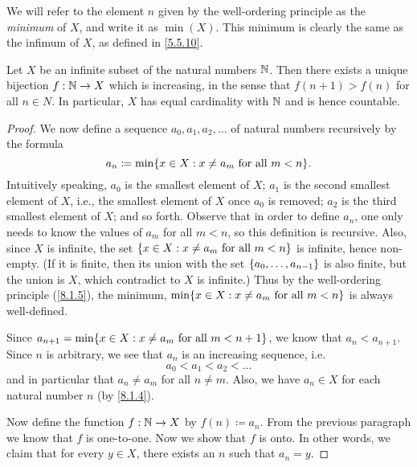\begin{note}
	We will refer to the element \(n\) given by the well-ordering principle as the \emph{minimum} of \(X\), and write it as \(\min(X)\).
	This minimum is clearly the same as the infimum of \(X\), as defined in \cref{5.5.10}.
\end{note}

\begin{prop}\label{8.1.5}
	Let \(X\) be an infinite subset of the natural numbers \(\mathbb{N}\).
	Then there exists a unique bijection \(f : \mathbb{N} \to X\) which is increasing, in the sense that \(f(n + 1) > f(n)\) for all \(n \in N\).
	In particular, \(X\) has equal cardinality with \(\mathbb{N}\) and is hence countable.
\end{prop}

\begin{proof}
	We now define a sequence \(a_0, a_1, a_2, \dots\) of natural numbers recursively by the formula
	\[
		a_n \coloneqq \min\set{x \in X : x \neq a_m \text{ for all } m < n}.
	\]
	Intuitively speaking, \(a_0\) is the smallest element of \(X\);
	\(a_1\) is the second smallest element of \(X\), i.e., the smallest element of \(X\) once \(a_0\) is removed;
	\(a_2\) is the third smallest element of \(X\);
	and so forth.
	Observe that in order to define \(a_n\), one only needs to know the values of \(a_m\) for all \(m < n\), so this definition is recursive.
	Also, since \(X\) is infinite, the set \(\left\lbrace x \in X : x \neq a_m \text{ for all } m < n\right\rbrace\) is infinite, hence non-empty.
	(If it is finite, then its union with the set \(\left\lbrace a_0, \dots, a_{n - 1}\right\rbrace\) is also finite, but the union is \(X\), which contradict to \(X\) is infinite.)
	Thus by the well-ordering principle (\cref{8.1.5}), the minimum, \(\min\set{x \in X : x \neq a_m \text{ for all } m < n}\) is always well-defined.

	Since \(a_{n + 1} = \min\set{x \in X : x \neq a_m \text{ for all } m < n + 1}\), we know that \(a_n < a_{n + 1}\).
	Since \(n\) is arbitrary, we see that \(a_n\) is an increasing sequence, i.e.
	\[
		a_0 < a_1 < a_2 < \dots
	\]
	and in particular that \(a_n \neq a_m\) for all \(n \neq m\).
	Also, we have \(a_n \in X\) for each natural number \(n\) (by \cref{8.1.4}).

	Now define the function \(f : \mathbb{N} \to X\) by \(f(n) \coloneqq a_n\).
	From the previous paragraph we know that \(f\) is one-to-one.
	Now we show that \(f\) is onto.
	In other words, we claim that for every \(y \in X\), there exists an \(n\) such that \(a_n = y\).


\end{proof}
